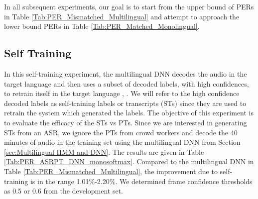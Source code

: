 \documentclass[a4paper]{article}
\begin{document}
In all subsequent experiments, our goal is to start from the upper bound of PERs in Table \ref{Tab:PER_Mismatched_Multilingual} and attempt to approach the lower bound PERs in Table \ref{Tab:PER_Matched_Monolingual}. 

\subsection{Self Training}
In this self-training experiment, the multilingual DNN decodes the audio in the target language and then uses a subset of decoded labels, with high confidences, to retrain itself in the target language \cite{Knill-SelfTrainingAndUnsupAdapt}, \cite{Vesely-SemisupTrainingDNN}. We will refer to the high confidence decoded labels as self-training labels or transcripts (STs) since they are used to retrain the system which generated the labels. The objective of this experiment is to evaluate the efficacy of the STs vs PTs. Since we are interested in generating STs from an ASR, we ignore the PTs from crowd workers and decode the 40 minutes of audio in the training set using the multilingual DNN from Section \ref{sec:Multilingual HMM and DNN}. The results are given in Table \ref{Tab:PER_ASRPT_DNN_monosoftmax}. Compared to the multilingual DNN in Table \ref{Tab:PER_Mismatched_Multilingual}, the improvement due to self-training is in the range 1.01\%-2.20\%. We determined frame confidence thresholds as 0.5 or 0.6 from the development set.





\newpage
\eightpt



\end{document}
